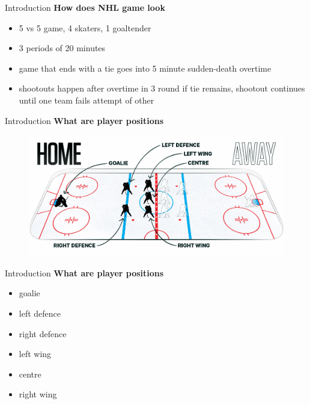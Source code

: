 \begin{frame}{Introduction}
    \textbf{How does NHL game look}\\
    \vspace{2em}
    \begin{itemize}
        \item 5 vs 5 game, 4 skaters, 1 goaltender
        \item 3 periods of 20 minutes
        \item game that ends with a tie goes into 5 minute sudden-death overtime
        \item shootouts happen after overtime in 3 round if tie remains, shootout continues until one team fails attempt of other
    \end{itemize}
\end{frame}

\begin{frame}{Introduction}
    \textbf{What are player positions}\\
    \vspace{2em}
    \begin{figure}[H]
        \includegraphics[width=\textwidth]{positions}
    \end{figure}
\end{frame}

\begin{frame}{Introduction}
    \textbf{What are player positions}\\
    \vspace{2em}
    \begin{itemize}
        \item goalie
        \item left defence
        \item right defence
        \item left wing
        \item centre
        \item right wing
    \end{itemize}
\end{frame}
